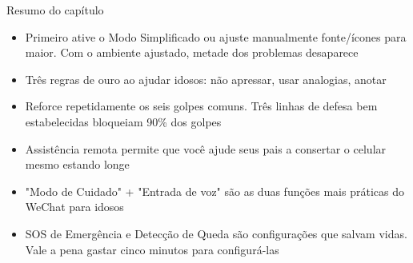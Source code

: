 \begin{tcbsummary}{Resumo do capítulo}
\begin{itemize}
  \item Primeiro ative o Modo Simplificado ou ajuste manualmente fonte/ícones para maior. Com o ambiente ajustado, metade dos problemas desaparece
  \item Três regras de ouro ao ajudar idosos: não apressar, usar analogias, anotar
  \item Reforce repetidamente os seis golpes comuns. Três linhas de defesa bem estabelecidas bloqueiam 90\% dos golpes
  \item Assistência remota permite que você ajude seus pais a consertar o celular mesmo estando longe
  \item "Modo de Cuidado" + "Entrada de voz" são as duas funções mais práticas do WeChat para idosos
  \item SOS de Emergência e Detecção de Queda são configurações que salvam vidas. Vale a pena gastar cinco minutos para configurá-las
\end{itemize}

\end{tcbsummary}
